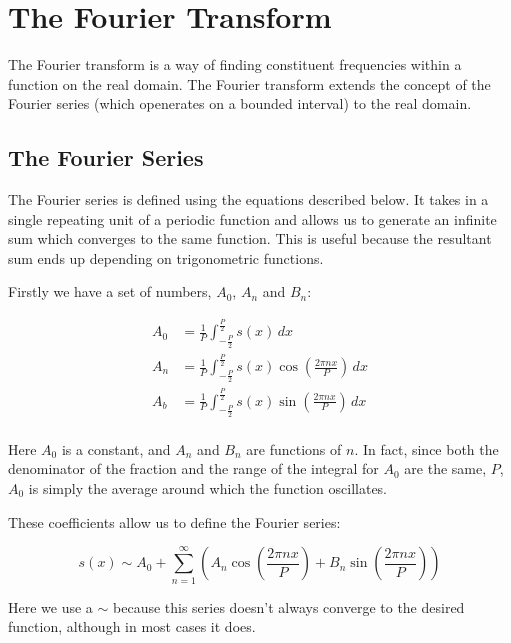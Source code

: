 \documentclass{article}
\begin{document}
\section{The Fourier Transform}

The Fourier transform is a way of finding constituent frequencies within a function on the real domain.
The Fourier transform extends the concept of the Fourier series (which openerates on a bounded interval) to the real
domain.

\subsection{The Fourier Series}

The Fourier series is defined using the equations described below.
It takes in a single repeating unit of a periodic function and allows us to generate an infinite sum which converges
to the same function. This is useful because the resultant sum ends up depending on trigonometric functions.

Firstly we have a set of numbers, \(A_0\), \(A_n\) and \(B_n\):

\begin{equation}
\begin{aligned}
	A_0 &= \frac{1}{P} \int_{-\frac{P}{2}}^{\frac{P}{2}}
		s(x) \,dx \\
	A_n &= \frac{1}{P} \int_{-\frac{P}{2}}^{\frac{P}{2}}
		s(x) \cos \left(\frac{2\pi nx}{P}\right) \,dx \\
	A_b &= \frac{1}{P} \int_{-\frac{P}{2}}^{\frac{P}{2}}
		s(x) \sin \left(\frac{2\pi nx}{P}\right) \,dx \\
\end{aligned}
\end{equation}

Here \(A_0\) is a constant, and \(A_n\) and \(B_n\) are functions of \(n\).
In fact, since both the denominator of the fraction and the range of the integral for \(A_0\) are the same, \(P\),
\(A_0\) is simply the average around which the function oscillates.

These coefficients allow us to define the Fourier series:

\begin{equation}
	s(x) \sim A_0 + \sum_{n=1}^{\infty} \left(
		A_n \cos \left( \frac{2\pi nx}{P} \right) +
		B_n \sin \left( \frac{2\pi nx}{P} \right)
	\right)
\end{equation}

Here we use a \(\sim\) because this series doesn't always converge to the desired function, although in most cases it
does.
\end{document}
